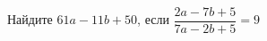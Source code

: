 \begin{ex}
	\begin{condition}
		Найдите \( 61a-11b+50 \), если \( \dfrac{2a-7b+5}{7a-2b+5}=9 \)
	\end{condition}
\end{ex}